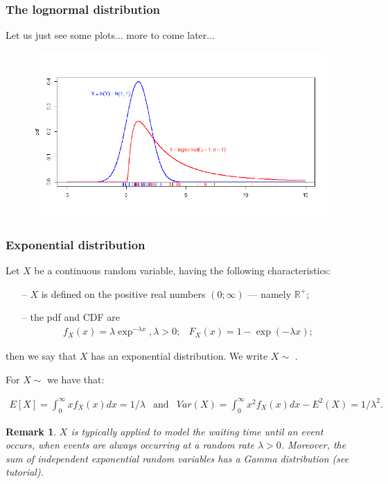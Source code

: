 \documentclass[notes=show,smaller,handout]{beamer}
\newtheorem{remark}{Remark}[section]
\newcommand{\bea}{\begin{eqnarray}}
\newcommand{\eea}{\end{eqnarray}}
\newcommand{\nn}{\nonumber}
\begin{document}
\begin{frame}%

\frametitle{The lognormal distribution}


Let us just see some plots... more to come later...
\begin{figure}[ptb]\centering
\includegraphics[height=2.4856in, width=4.5in]{lognormal_with_rug__8.pdf}%
\end{figure}%

\end{frame}%


\begin{frame}
\frametitle{Exponential distribution}


\begin{definition}
Let $X$ be a  continuous random variable, having the following  characteristics:
\begin{itemize}
\item[--]       $X$ is defined on the positive real numbers $\left( 0;\infty \right) $ --- namely $\mathbb{R}^+$;  
\item[--]       the pdf and CDF are 
\bea
f_X(x)=\lambda \exp^{ -\lambda x},\lambda
>0; &
F_X(x)=1-\exp (-\lambda x); \nn \eea 
\end{itemize}
then we say that $X$ has an exponential distribution. We write $X\sim$ .
\end{definition}

For $X\sim$  we have that:  
\begin{small}
\bea
E[X]=\int_{0}^{\infty }xf_X(x )dx= 1/\lambda & \text{and} &   Var(X)=\int_{0}^{\infty }x^{2}f_X(x )dx-E^{2}(X)=1/\lambda ^{2}. \nn
\eea
\end{small}

\begin{remark}
$X$ is typically applied to model the waiting time until an event occurs, when events are always occurring at a random rate $\lambda >0$. Moreover, the sum of independent exponential random variables has a Gamma distribution (see tutorial).
\end{remark}
\end{frame}%
\end{document}
